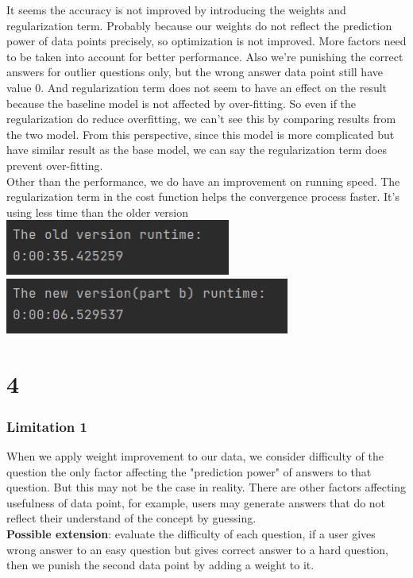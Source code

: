 \documentclass[12pt]{article}
\begin{document}
	It seems the accuracy is not improved by introducing the weights and regularization term. Probably because our weights do not reflect the prediction power of data points precisely, so optimization is not improved. More factors need to be taken into account for better performance. Also we're punishing the correct answers for outlier questions only, but the wrong answer data point still have value $0$. And regularization term does not seem to have an effect on the result because the baseline model is not affected by over-fitting. So even if the regularization do reduce overfitting, we can't see this by comparing results from the two model. From this perspective, since this model is more complicated but have similar result as the base model, we can say the regularization term does prevent over-fitting.\\
	Other than the performance, we do have an improvement on running speed. The regularization term in the cost function helps the convergence process faster. It's using less time than the older version\\
	\includegraphics[scale=1]{b33a}\quad\quad\includegraphics[scale=1]{b33b}\\
	
	
	\section*{4}
	\subsubsection*{Limitation 1}
	When we apply weight improvement to our data, we consider difficulty of the question the only factor affecting the "prediction power" of answers to that question. But this may not be the case in reality. There are other factors affecting usefulness of data point, for example, users may generate answers that do not reflect their understand of the concept by guessing.\\
	\textbf{Possible extension}: evaluate the difficulty of each question, if a user gives wrong answer to an easy question but gives correct answer to a hard question, then we punish the second data point by adding a weight to it.\\
\end{document}
